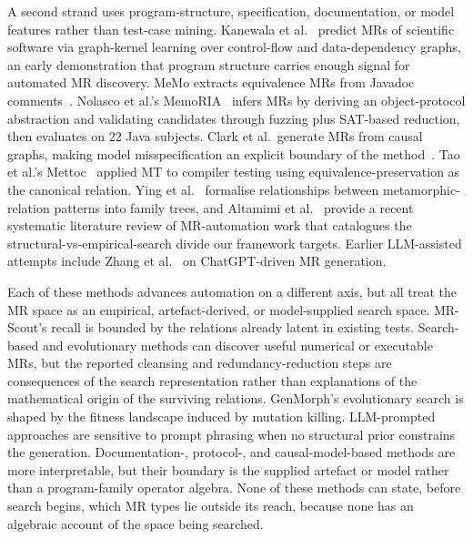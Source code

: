 \documentclass[acmsmall,screen,review]{acmart}
\begin{document}
A second strand uses program-structure, specification, documentation, or model features rather than test-case mining. Kanewala et al.~\cite{Kanewala2016GraphKernel} predict MRs of scientific software via graph-kernel learning over control-flow and data-dependency graphs, an early demonstration that program structure carries enough signal for automated MR discovery. MeMo extracts equivalence MRs from Javadoc comments~\cite{Blasi2021MeMo}. Nolasco et al.'s MemoRIA~\cite{Nolasco2024MemoRIA} infers MRs by deriving an object-protocol abstraction and validating candidates through fuzzing plus SAT-based reduction, then evaluates on 22 Java subjects. Clark et al.\ generate MRs from causal graphs, making model misspecification an explicit boundary of the method~\cite{Clark2023CausalMT}. Tao et al.'s Mettoc~\cite{Tao2010Mettoc} applied MT to compiler testing using equivalence-preservation as the canonical relation. Ying et al.~\cite{Ying2025MRPatterns} formalise relationships between metamorphic-relation patterns into family trees, and Altamimi et al.~\cite{Altamimi2022MRSLR} provide a recent systematic literature review of MR-automation work that catalogues the structural-vs-empirical-search divide our framework targets. Earlier LLM-assisted attempts include Zhang et al.~\cite{ZhangChatGPTMR2023} on ChatGPT-driven MR generation.

Each of these methods advances automation on a different axis, but all treat the MR space as an empirical, artefact-derived, or model-supplied search space. MR-Scout's recall is bounded by the relations already latent in existing tests. Search-based and evolutionary methods can discover useful numerical or executable MRs, but the reported cleansing and redundancy-reduction steps are consequences of the search representation rather than explanations of the mathematical origin of the surviving relations. GenMorph's evolutionary search is shaped by the fitness landscape induced by mutation killing. LLM-prompted approaches are sensitive to prompt phrasing when no structural prior constrains the generation. Documentation-, protocol-, and causal-model-based methods are more interpretable, but their boundary is the supplied artefact or model rather than a program-family operator algebra. None of these methods can state, before search begins, which MR types lie outside its reach, because none has an algebraic account of the space being searched.
\end{document}
